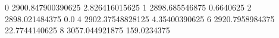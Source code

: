 0 2900.847900390625 2.826416015625
1 2898.685546875 0.6640625
2 2898.021484375 0.0
4 2902.37548828125 4.35400390625
6 2920.7958984375 22.7744140625
8 3057.044921875 159.0234375
